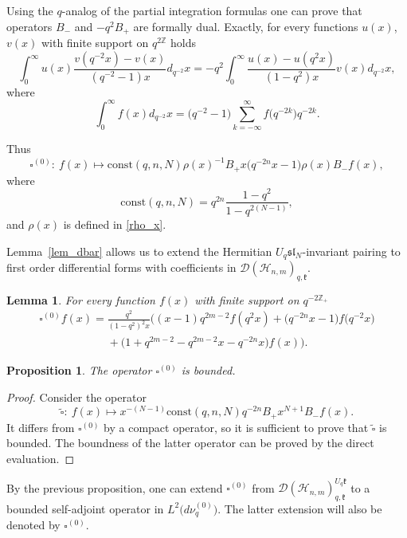 \documentclass[11pt]{article}
\newtheorem{lemma}{Lemma}
\newtheorem{proposition}{Proposition}
\begin{document}
Using the $q$-analog of the partial integration formulas one can prove that operators $B_-$ and $-q^2 B_+$
are formally dual. Exactly, for every functions $u(x)$, $v(x)$ with f\/inite support on $q^{2\mathbb{Z}}$ holds
\[ \int_0^\infty u(x) \frac{v(q^{-2}x)-v(x)}{(q^{-2}-1)x} d_{q^{-2}} x = -q^2 \int_0^\infty
\frac{u(x)-u(q^2x)}{(1-q^2)x} v(x) d_{q^{-2}} x,
\]
where
\[
\int_0^\infty f(x) d_{q^{-2}} x = \big(q^{-2} - 1\big)
\sum\limits_{k=-\infty}^\infty f\big(q^{-2k}\big) q^{-2k}.
\]

Thus
\[
\square^{(0)}: \ f(x) \mapsto \mathrm{const}(q, n, N) \rho(x)^{-1} B_+ x \big(q^{-2n} x - 1\big) \rho(x) B_- f(x),
\]
where
\[
\mathrm{const}(q, n, N) = q^{2n} \frac{1-q^2}{1-q^{2(N-1)}},
\]
and $\rho(x)$ is def\/ined in \eqref{rho_x}.

Lemma~\ref{lem_dbar} allows us to extend the Hermitian $U_q
\mathfrak{sl}_N$-invariant pairing to f\/irst order dif\/ferential forms with
coef\/f\/icients in $\mathscr{D}(\mathscr{H}_{n,m})_{q,\mathfrak{k}}$.

\begin{lemma}
For every function $f(x)$ with finite support on $q^{-2\mathbb{Z}_+}$
\begin{gather*}
\square^{(0)} f(x) = \frac{q^2}{(1-q^2)^2x} \big((x-1)q^{2m-2}f(q^2x) +
\big(q^{-2n}x-1\big)f\big(q^{-2}x\big)\\
\phantom{\square^{(0)} f(x) =}{}
+\big(1+q^{2m-2}-q^{2m-2}x-q^{-2n}x\big)f(x)\big).
\end{gather*}
\end{lemma}

\begin{proposition}\label{cont_spec}
The operator $\square^{(0)}$ is bounded.
\end{proposition}

\begin{proof} Consider the operator
\[
\widetilde{\square} : \ f(x) \mapsto x^{-(N-1)} \mathrm{const}(q, n, N) q^{-2n} B_+ x^{N+1} B_-f(x).
\]
It dif\/fers from $\square^{(0)}$ by a compact operator, so it is suf\/f\/icient to prove that
$\widetilde{\square}$ is bounded. The boundness of the latter operator can be proved by the direct
evaluation.
\end{proof}

By the previous proposition, one can extend $\square^{(0)}$ from
$\mathscr{D}(\mathscr{H}_{n,m})_{q,\mathfrak{k}}^{U_q \mathfrak{k}}$ to a bounded self-adjoint operator in
$L^2\big(d\nu_q^{(0)}\big)$. The latter extension will also be denoted by $\square^{(0)}$.
\end{document}

